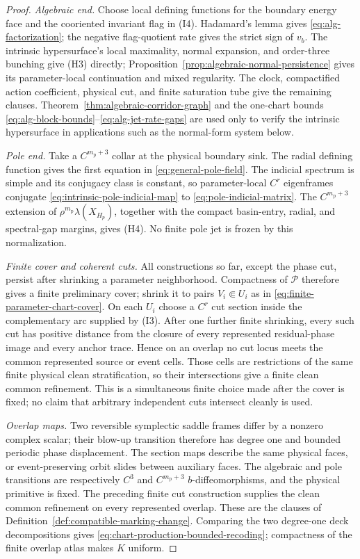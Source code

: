 \documentclass[11pt]{amsart}
\numberwithin{equation}{section}
\theoremstyle{definition}
\theoremstyle{remark}
\begin{document}
\begin{proof}
\emph{Algebraic end.}
Choose local defining functions for the boundary energy face and the
cooriented invariant flag in \textup{(I4)}.  Hadamard's lemma gives
\eqref{eq:alg-factorization}; the negative flag-quotient rate gives the
strict sign of $v_b$.  The intrinsic hypersurface's local maximality,
normal expansion, and order-three bunching give \textup{(H3)} directly;
Proposition~\ref{prop:algebraic-normal-persistence} gives its
parameter-local continuation and mixed regularity.  The clock,
compactified action coefficient, physical cut, and finite saturation tube
give the remaining clauses.  Theorem~\ref{thm:algebraic-corridor-graph}
and the one-chart bounds
\eqref{eq:alg-block-bounds}--\eqref{eq:alg-jet-rate-gaps} are used only to
verify the intrinsic hypersurface in applications such as the normal-form
system below.

\emph{Pole end.}
Take a $C^{m_{\mathrm p}+3}$ collar at the physical boundary sink.  The radial defining
function gives the first equation in
\eqref{eq:general-pole-field}.  The indicial spectrum is simple and its
conjugacy class is constant, so parameter-local $C^r$ eigenframes conjugate
\eqref{eq:intrinsic-pole-indicial-map} to
\eqref{eq:pole-indicial-matrix}.  The $C^{m_{\mathrm p}+3}$ extension of
$\rho^{m_{\mathrm p}}\lambda(X_{H_p})$, together with the compact
basin-entry, radial, and spectral-gap margins, gives \textup{(H4)}.  No
finite pole jet is frozen by this normalization.

\emph{Finite cover and coherent cuts.}
All constructions so far, except the phase cut, persist after shrinking a
parameter neighborhood.  Compactness of $\mathcal P$ therefore gives a
finite preliminary cover; shrink it to pairs
$V_i\Subset U_i$ as in \eqref{eq:finite-parameter-chart-cover}.  On each
$U_i$ choose a $C^r$ cut section inside the complementary arc supplied by
\textup{(I3)}.  After one further finite shrinking, every such cut has
positive distance from the closure of every represented residual-phase
image and every anchor trace.  Hence on an overlap no cut locus meets the
common represented source or event cells.  Those cells are restrictions
of the same finite physical clean stratification, so their intersections
give a finite clean common refinement.  This is a simultaneous finite
choice made after the cover is fixed; no claim that arbitrary independent
cuts intersect cleanly is used.

\emph{Overlap maps.}
Two reversible symplectic saddle frames differ by a nonzero complex
scalar; their blow-up transition therefore has degree one and bounded
periodic phase displacement.  The section maps describe the same physical
faces, or event-preserving orbit slides between auxiliary faces.  The
algebraic and pole transitions are respectively $C^3$ and
$C^{m_{\mathrm p}+3}$
$b$-diffeomorphisms, and the physical primitive is fixed.  The preceding
finite cut construction supplies the clean common refinement on every
represented overlap.  These are
the clauses of Definition~\ref{def:compatible-marking-change}.  Comparing
the two degree-one deck decompositions gives
\eqref{eq:chart-production-bounded-recoding}; compactness of the finite
overlap atlas makes $K$ uniform.


\end{proof}
\end{document}
